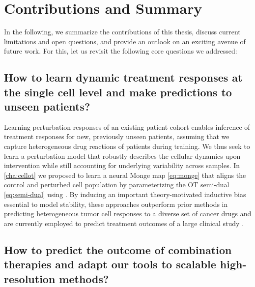 \section*{Contributions and Summary}

In the following, we summarize the contributions of this thesis, discuss current limitations and open questions, and provide an outlook on an exciting avenue of future work.
For this, let us revisit the following core questions we addressed:

\subsection*{\textbf{How to learn dynamic treatment responses at the single cell level and make predictions to unseen patients?}}

 Learning perturbation responses of an existing patient cohort enables inference of treatment responses for new, previously unseen patients, assuming that we capture heterogeneous drug reactions of patients during training.
We thus seek to learn a perturbation model that robustly describes the cellular dynamics upon intervention while still accounting for underlying variability across samples.
In \cref{cha:cellot} we proposed to learn a neural Monge map \eqref{eq:monge} that aligns the control and perturbed cell population by parameterizing the \acrshort{OT} semi-dual \eqref{eq:semi-dual} using  \citep{bunne2021learning, makkuva2020optimal, amos2017input}.
By inducing an important theory-motivated inductive bias essential to model stability, these approaches outperform prior methods in predicting heterogeneous tumor cell responses to a diverse set of cancer drugs and are currently employed to predict treatment outcomes of a large clinical study \citep{irmisch2021tumor}.

\subsection*{\textbf{How to predict the outcome of combination therapies and adapt our tools to scalable high-resolution methods?}}

